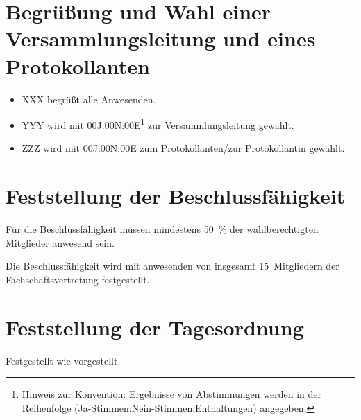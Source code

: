 \documentclass[sitzung=fsv-konstituierend,entwurf]{fsphys-protokoll}
\begin{document}
	
\section{Begrüßung und Wahl einer Versammlungsleitung und eines Protokollanten}
\begin{itemize}
	\item XXX begrüßt alle Anwesenden.
	\item YYY wird mit 00J:00N:00E\footnote{Hinweis zur Konvention: Ergebnisse von Abstimmungen werden in der Reihenfolge (Ja-Stimmen:Nein-Stimmen:Enthaltungen) angegeben.} zur Versammlungsleitung gewählt.
	\item ZZZ wird mit 00J:00N:00E zum Protokollanten/zur Protokollantin gewählt.
\end{itemize}

\section{Feststellung der Beschlussfähigkeit}
Für die Beschlussfähigkeit müssen mindestens \SI{50}{\percent} der wahlberechtigten Mitglieder anwesend sein.

Die Beschlussfähigkeit wird mit {\protokollanzahlanwesend} anwesenden von insgesamt 15~Mitgliedern der Fachschaftsvertretung festgestellt.

\section{Feststellung der Tagesordnung}
Festgestellt wie vorgestellt.
\end{document}
